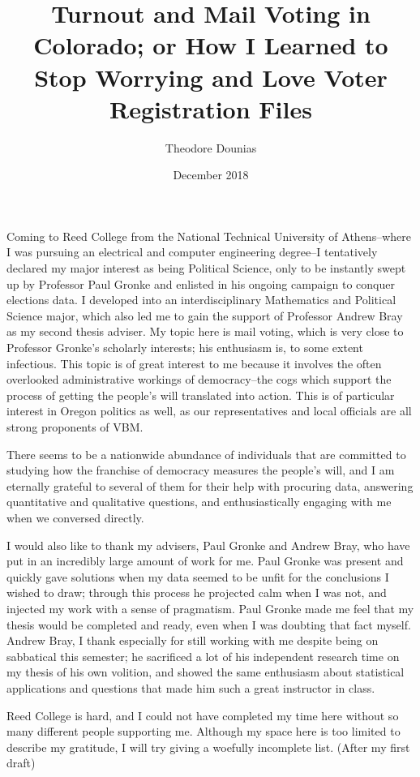 \documentclass[12pt,twoside]{reedthesis}
\title{Turnout and Mail Voting in Colorado; or How I Learned to Stop Worrying
and Love Voter Registration Files}
\author{Theodore Dounias}
\date{December 2018}
\begin{document}
      \maketitle
  
  \frontmatter %
  \pagestyle{empty} %

  
      \begin{preface}
      Coming to Reed College from the National Technical University of
      Athens--where I was pursuing an electrical and computer engineering
      degree--I tentatively declared my major interest as being Political
      Science, only to be instantly swept up by Professor Paul Gronke and
      enlisted in his ongoing campaign to conquer elections data. I developed
      into an interdisciplinary Mathematics and Political Science major, which
      also led me to gain the support of Professor Andrew Bray as my second
      thesis adviser. My topic here is mail voting, which is very close to
      Professor Gronke's scholarly interests; his enthusiasm is, to some
      extent infectious. This topic is of great interest to me because it
      involves the often overlooked administrative workings of democracy--the
      cogs which support the process of getting the people's will translated
      into action. This is of particular interest in Oregon politics as well,
      as our representatives and local officials are all strong proponents of
      VBM. \par There seems to be a nationwide abundance of individuals that
      are committed to studying how the franchise of democracy measures the
      people's will, and I am eternally grateful to several of them for their
      help with procuring data, answering quantitative and qualitative
      questions, and enthusiastically engaging with me when we conversed
      directly. \par I would also like to thank my advisers, Paul Gronke and
      Andrew Bray, who have put in an incredibly large amount of work for me.
      Paul Gronke was present and quickly gave solutions when my data seemed
      to be unfit for the conclusions I wished to draw; through this process
      he projected calm when I was not, and injected my work with a sense of
      pragmatism. Paul Gronke made me feel that my thesis would be completed
      and ready, even when I was doubting that fact myself. Andrew Bray, I
      thank especially for still working with me despite being on sabbatical
      this semester; he sacrificed a lot of his independent research time on
      my thesis of his own volition, and showed the same enthusiasm about
      statistical applications and questions that made him such a great
      instructor in class. \par Reed College is hard, and I could not have
      completed my time here without so many different people supporting me.
      Although my space here is too limited to describe my gratitude, I will
      try giving a woefully incomplete list. (After my first draft)
    \end{preface}
  
\end{document}
